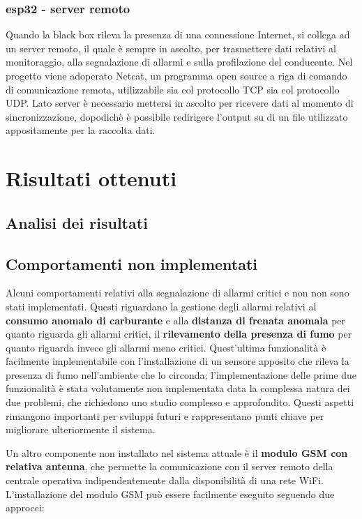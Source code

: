 \documentclass[12pt, a4paper, italian]{report}
\numberwithin{figure}{chapter}
\numberwithin{table}{chapter}
\begin{document}
\subsection{esp32 - server remoto}
Quando la black box rileva la presenza di una connessione Internet, si collega ad un server remoto, il quale è sempre in ascolto, per trasmettere dati relativi al monitoraggio, alla segnalazione di allarmi e sulla profilazione del conducente. 
Nel progetto viene adoperato Netcat, un programma open source a riga di comando di comunicazione remota, utilizzabile sia col protocollo TCP sia col protocollo UDP. Lato server è necessario mettersi in ascolto per ricevere dati al momento di sincronizzazione, dopodichè è possibile redirigere l'output su di un file utilizzato appositamente per la raccolta dati.

\chapter{Risultati ottenuti}
\section{Analisi dei risultati}
\section{Comportamenti non implementati}
Alcuni comportamenti relativi alla segnalazione di allarmi critici e non non sono stati implementati. Questi riguardano la gestione degli allarmi relativi al \textbf{consumo anomalo di carburante} e alla \textbf{distanza di frenata anomala} per quanto riguarda gli allarmi critici, il \textbf{rilevamento della presenza di fumo} per quanto riguarda invece gli allarmi meno critici. Quest'ultima funzionalità è facilmente implementabile con l'installazione di un sensore apposito che rileva la presenza di fumo nell'ambiente che lo circonda; l'implementazione delle prime due funzionalità è stata volutamente non implementata data la complessa natura dei due problemi, che richiedono uno studio complesso e approfondito. Questi aspetti rimangono importanti per sviluppi futuri e rappresentano punti chiave per migliorare ulteriormente il sistema.

Un altro componente non installato nel sistema attuale è il \textbf{modulo GSM con relativa antenna}, che permette la comunicazione con il server remoto della centrale operativa indipendentemente dalla disponibilità di una rete WiFi.
L'installazione del modulo GSM può essere facilmente eseguito seguendo due approcci: 
\end{document}
